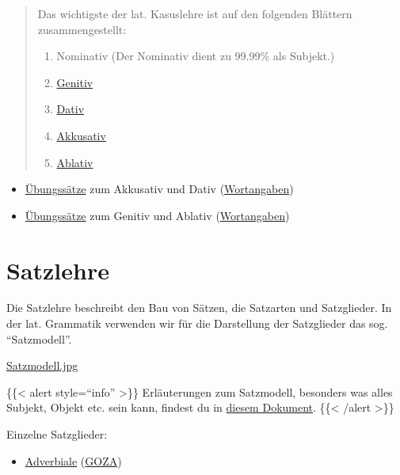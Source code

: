 \documentclass{scrartcl}
\begin{document}
\begin{quote}
Das wichtigste der lat. Kasuslehre ist auf den folgenden Blättern
zusammengestellt:

\begin{enumerate}
\item Nominativ (Der Nominativ dient zu 99.99\% als Subjekt.)
\item \href{https://www.dropbox.com/s/u58tqi635cecqop/Genitiv.pdf?dl=0}{Genitiv}
\item \href{https://www.dropbox.com/s/5840ago7l6yus57/Dativ.pdf?dl=0}{Dativ}
\item \href{https://www.dropbox.com/s/jkexxtwk9vcq9x4/Akkusativ.pdf?dl=0}{Akkusativ}
\item \href{https://www.dropbox.com/s/lqshx110lt0ktyn/Ablativ.pdf?dl=0}{Ablativ}
\end{enumerate}
\end{quote}



\begin{itemize}
\item \href{https://www.dropbox.com/s/akc5ni1scwurcft/Akkusativ\_Dativ.pdf?dl=0}{Übungssätze} zum Akkusativ und Dativ (\href{https://www.dropbox.com/s/84atgr40hz3of1y/Akk\_Dat.pdf?dl=0}{Wortangaben})
\item \href{https://www.dropbox.com/s/y8u45qf1ejjlyyh/Genitiv\_Ablativ.pdf?dl=0}{Übungssätze} zum Genitiv und Ablativ (\href{https://www.dropbox.com/s/jh8hztx21svu1rn/Wortangaben\_Genitiv\_Ablativ.pdf?dl=0}{Wortangaben})
\end{itemize}

\section{Satzlehre}
\label{sec:org1743d98}
Die Satzlehre beschreibt den Bau von Sätzen, die Satzarten und
Satzglieder. In der lat. Grammatik verwenden wir für die Darstellung
der Satzglieder das sog. "`Satzmodell"'.

\href{file:///Users/aeneas/Dropbox/Hugo\_ArsGrammatica/content/grammatik/satzmodellfarbig.jpg}{Satzmodell.jpg}

\{\{< alert style="`info"' >\}\}
Erläuterungen zum Satzmodell, besonders was alles Subjekt, Objekt
etc. sein kann, findest du in \href{https://www.dropbox.com/s/id081k5itrib85b/Z19\_Satzmodell.pdf?dl=0}{diesem Dokument}. 
\{\{< /alert >\}\}

Einzelne Satzglieder:
\begin{itemize}
\item \href{https://www.dropbox.com/s/wr2x8xo41ig6jlf/Adverbiale.pdf?dl=0}{Adverbiale} (\href{https://www.dropbox.com/s/pw7znlffgywbows/AC7AdverbialeGOZA.pdf?dl=0}{GOZA})
\end{itemize}
\end{document}
